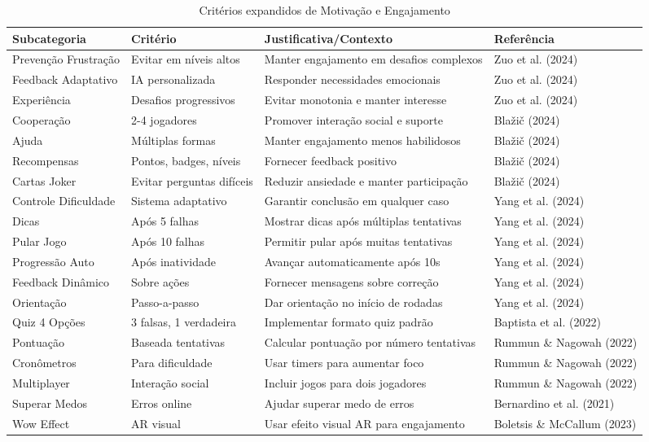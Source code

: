 \begin{table}[H]
\begin{table}[H]
\centering
\caption{Critérios expandidos de Motivação e Engajamento}
\label{tab:motivacao_expandida}
\begin{tabular}{p{2.5cm}p{3.5cm}p{4.5cm}p{2.5cm}}
\hline
\textbf{Subcategoria} & \textbf{Critério} & \textbf{Justificativa/Contexto} & \textbf{Referência} \\ \hline
Prevenção Frustração & Evitar em níveis altos & Manter engajamento em desafios complexos & Zuo et al. (2024) \\
Feedback Adaptativo & IA personalizada & Responder necessidades emocionais & Zuo et al. (2024) \\
Experiência & Desafios progressivos & Evitar monotonia e manter interesse & Zuo et al. (2024) \\
Cooperação & 2-4 jogadores & Promover interação social e suporte & Blažič (2024) \\
Ajuda & Múltiplas formas & Manter engajamento menos habilidosos & Blažič (2024) \\
Recompensas & Pontos, badges, níveis & Fornecer feedback positivo & Blažič (2024) \\
Cartas Joker & Evitar perguntas difíceis & Reduzir ansiedade e manter participação & Blažič (2024) \\
Controle Dificuldade & Sistema adaptativo & Garantir conclusão em qualquer caso & Yang et al. (2024) \\
Dicas & Após 5 falhas & Mostrar dicas após múltiplas tentativas & Yang et al. (2024) \\
Pular Jogo & Após 10 falhas & Permitir pular após muitas tentativas & Yang et al. (2024) \\
Progressão Auto & Após inatividade & Avançar automaticamente após 10s & Yang et al. (2024) \\
Feedback Dinâmico & Sobre ações & Fornecer mensagens sobre correção & Yang et al. (2024) \\
Orientação & Passo-a-passo & Dar orientação no início de rodadas & Yang et al. (2024) \\
Quiz 4 Opções & 3 falsas, 1 verdadeira & Implementar formato quiz padrão & Baptista et al. (2022) \\
Pontuação & Baseada tentativas & Calcular pontuação por número tentativas & Rummun \& Nagowah (2022) \\
Cronômetros & Para dificuldade & Usar timers para aumentar foco & Rummun \& Nagowah (2022) \\
Multiplayer & Interação social & Incluir jogos para dois jogadores & Rummun \& Nagowah (2022) \\
Superar Medos & Erros online & Ajudar superar medo de erros & Bernardino et al. (2021) \\
Wow Effect & AR visual & Usar efeito visual AR para engajamento & Boletsis \& McCallum (2023) \\
\hline
\end{tabular}
\end{table}


\end{table}

